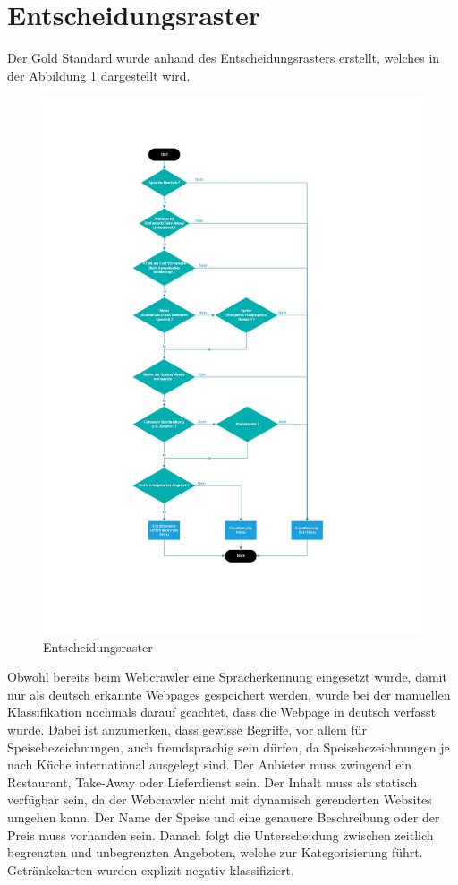 \section{Entscheidungsraster}
Der Gold Standard wurde anhand des Entscheidungsrasters erstellt, welches in der Abbildung \cref{fig:classificationtree} dargestellt wird.
\begin{figure}[H]	
	\includegraphics[width=1\columnwidth,keepaspectratio]{img/man-classification-tree.jpg}
	\caption{Entscheidungsraster}
	\label{fig:classificationtree}
\end{figure}
Obwohl bereits beim Webcrawler eine Spracherkennung eingesetzt wurde, damit nur als deutsch erkannte Webpages gespeichert werden, wurde bei der manuellen Klassifikation nochmals darauf geachtet, dass die Webpage in deutsch verfasst wurde.
Dabei ist anzumerken, dass gewisse Begriffe, vor allem für Speisebezeichnungen, auch fremdsprachig sein dürfen, da Speisebezeichnungen je nach Küche international ausgelegt sind.
Der Anbieter muss zwingend ein Restaurant, Take-Away oder Lieferdienst sein.
Der Inhalt muss als statisch verfügbar sein, da der Webcrawler nicht mit dynamisch gerenderten Websites umgehen kann.
Der Name der Speise und eine genauere Beschreibung oder der Preis muss vorhanden sein.
Danach folgt die Unterscheidung zwischen zeitlich begrenzten und unbegrenzten Angeboten, welche zur Kategorisierung führt.
Getränkekarten wurden explizit negativ klassifiziert.
